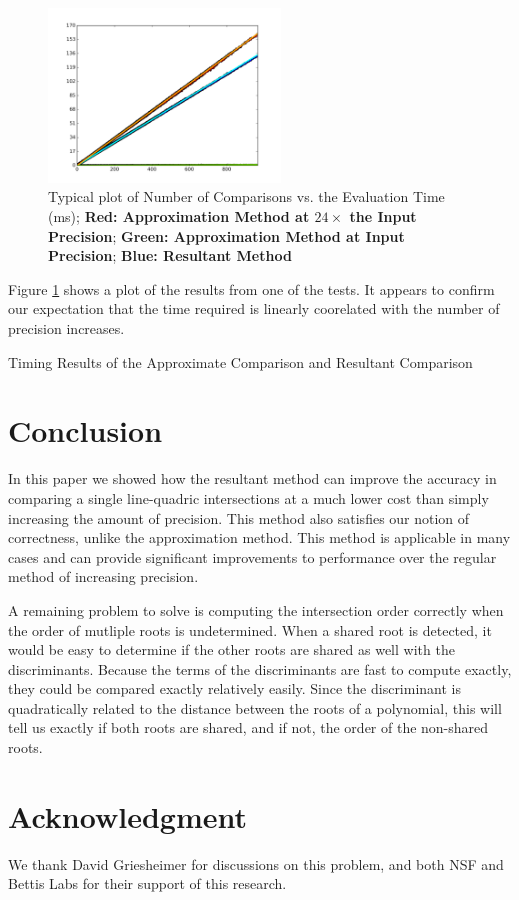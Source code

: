 \documentclass{cccg16}
\begin{document}
\begin{figure}
  \includegraphics[width=0.55\textwidth]{imgs/hardEllipsoidsSingle_gentoo_adjusted.png}
  \caption{Typical plot of Number of Comparisons vs. the Evaluation
    Time (ms); {\bf Red: Approximation Method at $24\times$ the
      Input Precision}; {\bf Green: Approximation Method at Input Precision}; {\bf Blue: Resultant Method}}
  \label{fig:linefit}
\end{figure}

Figure \ref{fig:linefit} shows a plot of the results from one of the
tests.  It appears to confirm our expectation that the time required
is linearly coorelated with the number of precision increases.

\begin{table}[p]
  \caption{Timing Results of the Approximate Comparison and Resultant Comparison}
  \label{tab:times}
  
\end{table}

\section{Conclusion}
In this paper we showed how the resultant method can improve the
accuracy in comparing a single line-quadric intersections at a much
lower cost than simply increasing the amount of precision.  This
method also satisfies our notion of correctness, unlike the
approximation method.  This method is applicable in many cases and can
provide significant improvements to performance over the regular
method of increasing precision.

A remaining problem to solve is computing the intersection order
correctly when the order of mutliple roots is undetermined.  When a
shared root is detected, it would be easy to determine if the other
roots are shared as well with the discriminants.  Because the terms of
the discriminants are fast to compute exactly, they could be compared
exactly relatively easily.  Since the discriminant is quadratically
related to the distance between the roots of a polynomial, this will
tell us exactly if both roots are shared, and if not, the order of the
non-shared roots.

\section{Acknowledgment}
We thank David Griesheimer for discussions on this problem, and both NSF and Bettis Labs for their support of this research. 



\end{document}
